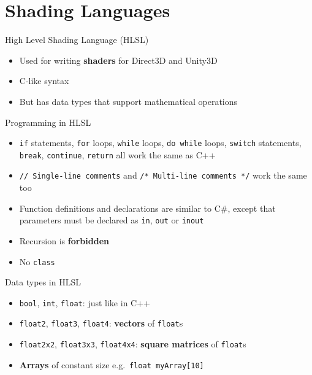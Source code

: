 \part{Shading Languages}
\frame{\partpage}


\begin{frame}{High Level Shading Language (HLSL)}
\begin{itemize}
	\item Used for writing \textbf{shaders} for Direct3D and Unity3D
	\pause\item C-like syntax
	\pause\item But has data types that support mathematical operations
\end{itemize}
\end{frame}

\begin{frame}{Programming in HLSL}
	\begin{itemize}
		\item \lstinline{if} statements, \lstinline{for} loops, \lstinline{while} loops, \lstinline{do while} loops, \lstinline{switch} statements,
		\lstinline{break}, \lstinline{continue}, \lstinline{return} all work the same as C++
		\pause\item \lstinline{// Single-line comments} and \lstinline{/* Multi-line comments */} work the same too
		\pause\item Function definitions and declarations are similar to C\#, except that parameters must be declared as
		\lstinline{in}, \lstinline{out} or \lstinline{inout}
		\pause\item Recursion is \textbf{forbidden}
		\pause\item No \lstinline{class}
	\end{itemize}
\end{frame}

\begin{frame}{Data types in HLSL}
	\begin{itemize}
		\item \lstinline{bool}, \lstinline{int}, \lstinline{float}: just like in C++
		\pause\item \lstinline{float2}, \lstinline{float3}, \lstinline{float4}: \textbf{vectors} of \lstinline{float}s
		\pause\item \lstinline{float2x2}, \lstinline{float3x3}, \lstinline{float4x4}: \textbf{square matrices} of \lstinline{float}s
		\pause\item \textbf{Arrays} of constant size e.g.\ \lstinline{float myArray[10]}
	\end{itemize}
\end{frame}

